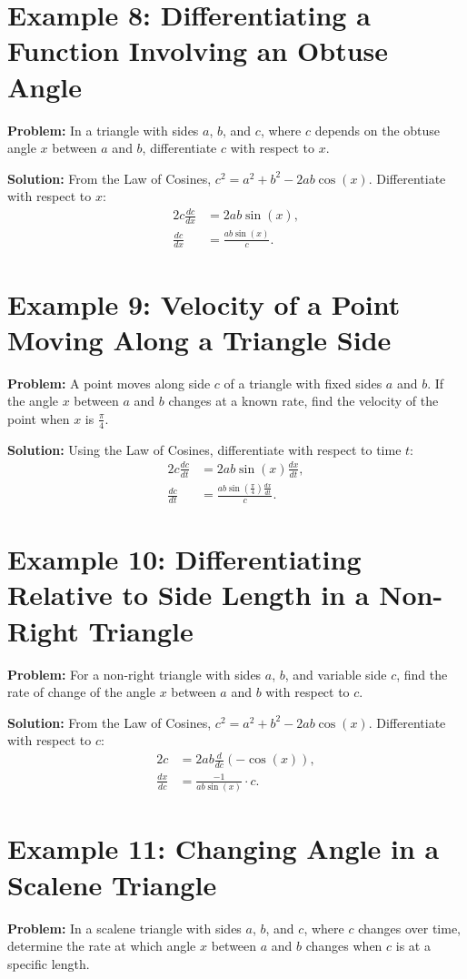 \documentclass[a4paper,12pt]{book}
\begin{document}
\section*{Example 8: Differentiating a Function Involving an Obtuse Angle}
\textbf{Problem:} In a triangle with sides $a$, $b$, and $c$, where $c$ depends on the obtuse angle $x$ between $a$ and $b$, differentiate $c$ with respect to $x$.

\textbf{Solution:}
From the Law of Cosines, $c^2 = a^2 + b^2 - 2ab \cos(x)$. Differentiate with respect to $x$:
\begin{align*}
2c \frac{dc}{dx} &= 2ab \sin(x), \\
\frac{dc}{dx} &= \frac{ab \sin(x)}{c}.
\end{align*}

\section*{Example 9: Velocity of a Point Moving Along a Triangle Side}
\textbf{Problem:} A point moves along side $c$ of a triangle with fixed sides $a$ and $b$. If the angle $x$ between $a$ and $b$ changes at a known rate, find the velocity of the point when $x$ is $\frac{\pi}{4}$.

\textbf{Solution:}
Using the Law of Cosines, differentiate with respect to time $t$:
\begin{align*}
2c \frac{dc}{dt} &= 2ab \sin(x) \frac{dx}{dt}, \\
\frac{dc}{dt} &= \frac{ab \sin\left(\frac{\pi}{4}\right) \frac{dx}{dt}}{c}.
\end{align*}

\section*{Example 10: Differentiating Relative to Side Length in a Non-Right Triangle}
\textbf{Problem:} For a non-right triangle with sides $a$, $b$, and variable side $c$, find the rate of change of the angle $x$ between $a$ and $b$ with respect to $c$.

\textbf{Solution:}
From the Law of Cosines, $c^2 = a^2 + b^2 - 2ab \cos(x)$. Differentiate with respect to $c$:
\begin{align*}
2c &= 2ab \frac{d}{dc}(-\cos(x)), \\
\frac{dx}{dc} &= \frac{-1}{ab \sin(x)} \cdot c.
\end{align*}

\section*{Example 11: Changing Angle in a Scalene Triangle}
\textbf{Problem:} In a scalene triangle with sides $a$, $b$, and $c$, where $c$ changes over time, determine the rate at which angle $x$ between $a$ and $b$ changes when $c$ is at a specific length.
\end{document}
